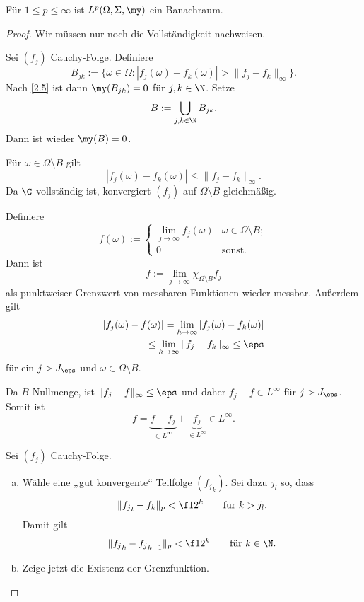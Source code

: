\begin{st} \label{2.12}
	Für $1 \le p \le \infty$ ist $L^p(\Omega, \Sigma, \my)$ ein Banachraum.
	\begin{proof}
		Wir müssen nur noch die Vollständigkeit nachweisen.
		\begin{seg}[$p=\infty$]
			Sei $(f_j)$ Cauchy-Folge.
			Definiere
			\[
				B_{jk} := \Big\{ \omega \in \Omega : |f_j(\omega) - f_k(\omega)| > \|f_j-f_k\|_\infty \Big\}.
			\]
			Nach \ref{2.5} ist dann $\my(B_{jk}) = 0$ für $j,k\in \N$. 
			Setze
			\[
				B := \bigcup_{j,k\in \N} B_{jk}.
			\]
			Dann ist wieder $\my(B) = 0$.

			Für $\omega \in \Omega \setminus B$ gilt
			\[
				|f_j(\omega) - f_k(\omega)| \le \|f_j-f_k\|_\infty.
			\]
			Da $\C$ vollständig ist, konvergiert $(f_j)$ auf $\Omega \setminus B$ gleichmäßig.

			Definiere
			\[
				f(\omega) := \begin{cases}
					\lim_{j \to \infty} f_j(\omega) & \omega \in \Omega \setminus B ;\\
					0 & \text{sonst.}
				\end{cases}
			\]
			Dann ist
			\[
				f := \lim_{j\to \infty} \chi_{\Omega \setminus B} f_j
			\]
			als punktweiser Grenzwert von messbaren Funktionen wieder messbar.
			Außerdem gilt
			\begin{align*}
				|f_j(\omega) - f(\omega) |
				= \lim_{h\to \infty} |f_j(\omega) - f_k(\omega)| \\
				\le \lim_{h\to \infty} \|f_j - f_k\|_{\infty}
				\le \eps
			\end{align*}
			für ein $j > J_\eps$ und $\omega \in \Omega \setminus B$.

			Da $B$ Nullmenge, ist $\|f_j - f\|_\infty \le \eps$ und daher $f_j - f \in L^\infty$ für $j > J_\eps$.
			Somit ist
			\[
				f = \underbrace{f - f_j}_{\in L^\infty} + \underbrace{f_j}_{\in L^\infty} \in L^\infty.
			\]
		\end{seg}
		\begin{seg}[$1 \le p < \infty$]
			Sei $(f_j)$ Cauchy-Folge.
			\begin{enumerate}[a)]
				\item
					Wähle eine „gut konvergente“ Teilfolge $({f_j}_k)$.
					Sei dazu $j_l$ so, dass 
					\[
						\|{f_j}_l - f_k\|_p < \f 1{2^k} \qquad \text{für $k>j_l$}.
					\]
					Damit gilt
					\[
						\|{f_j}_k - {f_j}_{k+1} \|_p < \f 1{2^k} \qquad \text{für $k \in \N$}.
					\]
				\item
					Zeige jetzt die Existenz der Grenzfunktion.


\end{enumerate}
\end{seg}
\end{proof}
\end{st}
